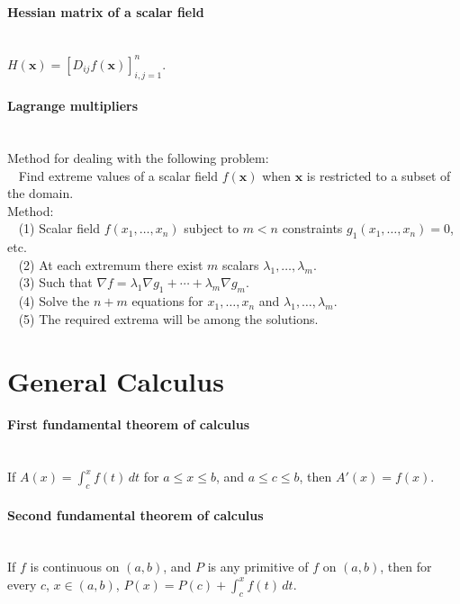 \documentclass[10pt]{article}
\newcommand{\bs}[1]{\pmb{#1}}
\begin{document}
\paragraph{Hessian matrix of a scalar field}\ \\
$H(\bs{x}) = [D_{ij}f(\bs{x})]_{i,j=1}^n$.

\paragraph{Lagrange multipliers}\ \\
Method for dealing with the following problem:\\
$\phantom{x}$ Find extreme values of a scalar field $f(\pmb{x})$ when $\pmb{x}$ is restricted to a subset of the domain.\\
Method:\\
$\phantom{x}$ (1) Scalar field $f(x_1,\dotsc,x_n)$ subject to $m < n$ constraints $g_1(x_1,\dotsc,x_n)=0$, etc.\\
$\phantom{x}$ (2) At each extremum there exist $m$ scalars $\lambda_1, \dotsc, \lambda_m$.\\
$\phantom{x}$ (3) Such that $\nabla f = \lambda_1 \nabla g_1 + \dotsb + \lambda_m \nabla g_m$.\\
$\phantom{x}$ (4) Solve the $n + m$ equations for $x_1,\dotsc,x_n$ and $\lambda_1,\dotsc,\lambda_m$.\\
$\phantom{x}$ (5) The required extrema will be among the solutions.




\bigskip\bigskip
\section{General Calculus}\smallskip

\paragraph{First fundamental theorem of calculus}\ \\
If $A(x) = \int_c^x f(t)\,dt$ for $a \leq x \leq b$, and $a \leq c \leq b$,
then $A'(x) = f(x)$.

\paragraph{Second fundamental theorem of calculus}\ \\
If $f$ is continuous on $(a,b)$, and $P$ is any primitive of $f$ on $(a,b)$,
then for every $c$, $x \in (a,b)$, $P(x) = P(c) + \int_c^x f(t)\,dt$.
\end{document}
